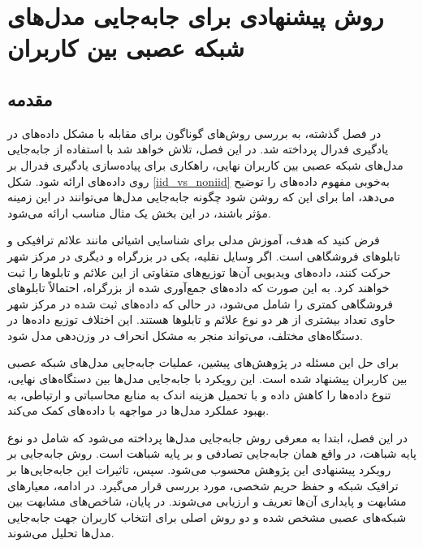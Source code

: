 \chapter{روش پیشنهادی برای جابه‌جایی مدل‌های شبکه عصبی بین کاربران}

\section{مقدمه}
در فصل گذشته، به بررسی روش‌های گوناگون برای مقابله با مشکل داده‌های 
در یادگیری فدرال پرداخته شد. در این فصل، تلاش خواهد شد با استفاده از جابه‌جایی مدل‌های شبکه عصبی بین کاربران نهایی، راهکاری برای پیاده‌سازی یادگیری فدرال بر روی داده‌های 
ارائه شود. شکل 
\ref{iid_vs_noniid}
به‌خوبی مفهوم داده‌های 
را توضیح می‌دهد، اما برای این که روشن شود چگونه جابه‌جایی مدل‌ها می‌توانند در این زمینه مؤثر باشند، در این بخش یک مثال مناسب ارائه می‌شود.

فرض کنید که هدف، آموزش مدلی برای شناسایی اشیائی مانند علائم ترافیکی و تابلوهای فروشگاهی است. اگر وسایل نقلیه، یکی در بزرگراه و دیگری در مرکز شهر حرکت کنند، داده‌های ویدیویی آن‌ها توزیع‌های متفاوتی از این علائم و تابلوها را ثبت خواهند کرد. به این صورت که داده‌های جمع‌آوری شده از بزرگراه، احتمالاً تابلوهای فروشگاهی کمتری را شامل می‌شود، در حالی که داده‌های ثبت شده در مرکز شهر حاوی تعداد بیشتری از هر دو نوع علائم و تابلوها هستند. این اختلاف توزیع داده‌ها در دستگاه‌های مختلف، می‌تواند منجر به مشکل انحراف در وزن‌دهی مدل شود.

برای حل این مسئله در پژوهش‌های پیشین، عملیات جابه‌جایی مدل‌های شبکه عصبی بین کاربران پیشنهاد شده است. این رویکرد با جابه‌جایی مدل‌ها بین دستگاه‌های نهایی، تنوع داده‌ها را کاهش داده و با تحمیل هزینه اندک به منابع محاسباتی و ارتباطی، به بهبود عملکرد مدل‌ها در مواجهه با داده‌های  کمک می‌کند.

در این فصل، ابتدا به معرفی روش جابه‌جایی مدل‌ها پرداخته می‌شود که شامل دو نوع جابه‌جایی تصادفی و بر پایه شباهت است. روش جابه‌جایی بر ‎پایه شباهت، در واقع همان رویکرد پیشنهادی این پژوهش محسوب می‌شود.
سپس، تاثیرات این جابه‌جایی‌ها بر ترافیک شبکه و حفظ حریم شخصی، مورد بررسی قرار می‌گیرد. در ادامه، معیارهای مشابهت و پایداری آن‌ها تعریف و ارزیابی می‌شوند. در پایان، شاخص‌های مشابهت بین شبکه‌های عصبی مشخص شده و دو روش اصلی برای انتخاب کاربران جهت جابه‌جایی مدل‌ها تحلیل می‌شوند.


